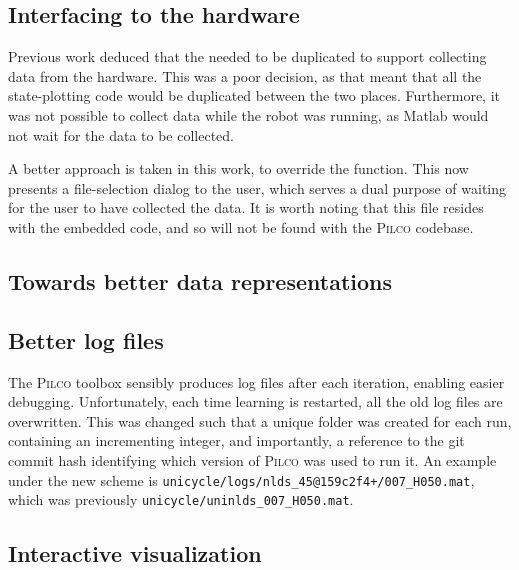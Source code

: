 \documentclass[main.tex]{subfiles}
\begin{document}
\subsection{Interfacing to the hardware}

Previous work deduced that the  needed to be duplicated to support collecting data from the hardware.
This was a poor decision, as that meant that all the state-plotting code would be duplicated between the two places.
Furthermore, it was not possible to collect data while the robot was running, as Matlab would not wait for the data to be collected.

A better approach is taken in this work, to override the  function.
This now presents a file-selection dialog to the user, which serves a dual purpose of waiting for the user to have collected the data.
It is worth noting that this file resides with the embedded code, and so will not be found with the \textsc{Pilco} codebase.

\subsection{Towards better data representations}

\subsection{Better log files}

The \textsc{Pilco} toolbox sensibly produces log files after each iteration, enabling easier debugging.
Unfortunately, each time learning is restarted, all the old log files are overwritten.
This was changed such that a unique folder was created for each run, containing an incrementing integer, and importantly, a reference to the git commit hash identifying which version of \textsc{Pilco} was used to run it. An example under the new scheme is \lstinline{unicycle/logs/nlds_45@159c2f4+/007_H050.mat}, which was previously \lstinline{unicycle/uninlds_007_H050.mat}.

\subsection{Interactive visualization}
\end{document}
